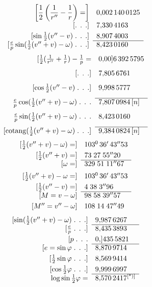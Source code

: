\clearpage
{}
\[
\begin{array}{rl}
{}\left[\dfrac12\left(\dfrac1{r''}-\dfrac1r\right)=\right]&0{,}002\,140\,0125\\[3pt]
{}[\text{. . .}]&7{,}330\,4163\\[3pt]
{}[\sin\frac12(v''-v)\;\text{. . .}]&8{,}907\,4003\\\cline{2-2}
{}[\frac ep\sin(\frac12(v''+v)-\omega)\;\text{. . .}]&8{,}423\,0160
\end{array}
\]
\[
\begin{array}{rl}
{}[\frac12(\frac1{r''}+\frac1r)-\frac1p=&0{,}00]6\,392\,5795\\[8pt]
{}[\text{. . .}]&7{,}805\,6761\\[8pt]
{}[\cos\frac12(v''-v)\;\text{. . .}]&9{,}998\,5777\\[8pt]\cline{2-2}
\frac ep\cos(\frac12(v''+v)-\omega)\;\text{. . .}&7{,}807\,0984\,[n]\\[8pt]
\frac ep\sin(\frac12(v''+v)-\omega)\;\text{. . .}&8{,}423\,0160\\[8pt]\cline{2-2}
{}[\operatorname{cotang}(\frac12(v''+v)-\omega)\;\text{. . .}]&9{,}384\,0824\,[n]
\end{array}
\]
\[
\begin{array}{rl}
{}[\frac12(v''+v)-\omega)=]&103^0\,36'\,43''53\\[3pt]
{}[\frac12(v''+v)=]&73\;27\;55''20\\\cline{2-2}
{}[\omega=]&329\;51\;11''67\\[5pt]
{}[\frac12(v''+v)-\omega=]&103^0\,36'\,43''53\\[3pt]
{}[\frac12(v''-v)=]&4\;38\;3''96\\\cline{2-2}
{}[M=v-\omega]&98\;58\;39''57\\[3pt]
{}[M''=v''-\omega]&108\;14\;47''49
\end{array}
\]
\[
\begin{array}{rl}
{}[\sin(\frac12(v''+v)-\omega)\;\text{. . .}]&9{,}987\,6267\\\cline{2-2}
{}[\frac ep\;\text{. . .}]&8{,}435\,3893\\[3pt]
{}[p\;\text{. . .}&0{,}]435\,5821\\\cline{2-2}
{}[e=\sin\varphi\;\text{. . .}]&8{,}870\,9714\\[3pt]
{}[\frac12\sin\varphi\;\text{. . .}]&8{,}569\,9414\\[3pt]
{}[\cos\frac12\varphi\;\text{. . .}]&9{,}999\,6997\\\cline{2-2}
\log\sin\frac12\varphi=&8{,}570\,2417\textsuperscript{[*)]}
\end{array}
\]
